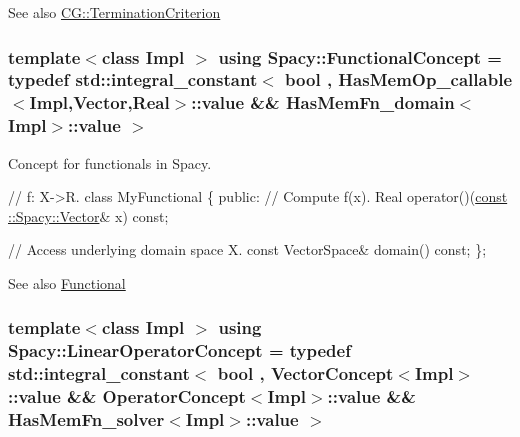 \begin{DoxySeeAlso}{See also}
\hyperlink{classSpacy_1_1CG_1_1TerminationCriterion}{C\+G\+::\+Termination\+Criterion} 
\end{DoxySeeAlso}
\hypertarget{group__ConceptGroup_gae45328d2e01ef6c8e5d948b69fda385f}{}
\subsubsection[{Functional\+Concept}]{\setlength{\rightskip}{0pt plus 5cm}template$<$class Impl $>$ using {\bf Spacy\+::\+Functional\+Concept} = typedef std\+::integral\+\_\+constant$<$ bool , Has\+Mem\+Op\+\_\+callable$<$Impl,Vector,Real$>$\+::value \&\& Has\+Mem\+Fn\+\_\+domain$<$Impl$>$\+::value $>$}\label{group__ConceptGroup_gae45328d2e01ef6c8e5d948b69fda385f}


Concept for functionals in Spacy. 

\label{group__ConceptGroup_FunctionalConceptGroup}%
\hypertarget{group__ConceptGroup_FunctionalConceptGroup}{}%

\begin{DoxyCode}
\textcolor{comment}{// f: X->R.}
\textcolor{keyword}{class }MyFunctional
\{
\textcolor{keyword}{public}:
  \textcolor{comment}{// Compute f(x).}
  Real operator()(\hyperlink{group__VectorSpaceGroup_gafda42fd5aa3f7597a42b9831bf4dfd07}{const ::Spacy::Vector}& x) \textcolor{keyword}{const};

  \textcolor{comment}{// Access underlying domain space X.}
  \textcolor{keyword}{const} VectorSpace& domain() \textcolor{keyword}{const};
\};
\end{DoxyCode}
 \begin{DoxySeeAlso}{See also}
\hyperlink{classSpacy_1_1Functional}{Functional} 
\end{DoxySeeAlso}
\hypertarget{group__ConceptGroup_ga8d3bdfc9abd844ab446a31fcd3f8ef8c}{}
\subsubsection[{Linear\+Operator\+Concept}]{\setlength{\rightskip}{0pt plus 5cm}template$<$class Impl $>$ using {\bf Spacy\+::\+Linear\+Operator\+Concept} = typedef std\+::integral\+\_\+constant$<$ bool , Vector\+Concept$<$Impl$>$\+::value \&\& Operator\+Concept$<$Impl$>$\+::value \&\& Has\+Mem\+Fn\+\_\+solver$<$Impl$>$\+::value $>$}\label{group__ConceptGroup_ga8d3bdfc9abd844ab446a31fcd3f8ef8c}
\label{group__ConceptGroup_LinearOperatorConceptAnchor}%
\hypertarget{group__ConceptGroup_LinearOperatorConceptAnchor}{}%
 
